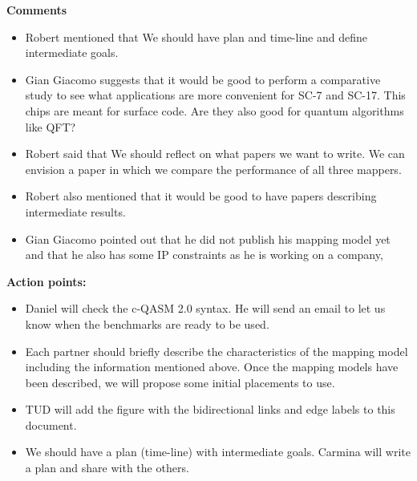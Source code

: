 \documentclass[11pt]{article}
\begin{document}
    \textbf{Comments}
\begin{itemize}

\item Robert mentioned that We should have plan and time-line and define intermediate goals.

\item Gian Giacomo suggests that it would be good to perform a comparative study to see what applications are more convenient for SC-7 and SC-17. This chips are meant for surface code. Are they also good for quantum algorithms like QFT? 

\item Robert said that We should reflect on what papers we want to write. We can envision a paper in which we compare the performance of all three mappers.

\item Robert also mentioned that it would be good to have papers describing intermediate results.

\item Gian Giacomo pointed out that he did not publish his mapping model yet and that he also has some IP constraints as he is working on a company,

\end{itemize}


\textbf{Action points:}

\begin{itemize}

    \item Daniel will check the c-QASM 2.0 syntax. He will send an email to let us know when the benchmarks are ready to be used.
    
    \item Each partner should briefly describe the characteristics of the mapping model including the information mentioned above. Once the mapping models have been described, we will propose some initial placements to use.
    
    \item TUD will add the figure with the bidirectional links and edge labels to this document.
    
    \item We should have a plan (time-line) with intermediate goals. Carmina will write a plan and share with the others.

    \end{itemize}
\end{document}
